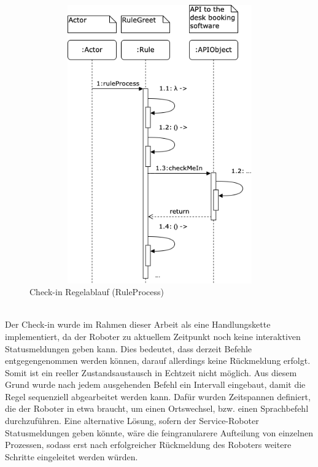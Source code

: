         \begin{figure}[hbt!]
            \centering
            \includegraphics[width=14cm,height=12cm,keepaspectratio]{images/sequence_rule_temi_greet.png}
            \caption{Check-in Regelablauf (RuleProcess)}
            \label{fig:sequenceRuleGreet}
        \end{figure}
        \\
        Der Check-in wurde im Rahmen dieser Arbeit als eine Handlungskette implementiert, da der Roboter zu aktuellem Zeitpunkt noch keine interaktiven Statusmeldungen geben kann. Dies 
        bedeutet, dass derzeit Befehle entgegengenommen werden können, darauf allerdings keine Rückmeldung erfolgt. Somit ist ein reeller Zustandsaustausch in Echtzeit nicht möglich. 
        Aus diesem Grund wurde nach jedem ausgehenden Befehl ein Intervall eingebaut, damit die Regel sequenziell abgearbeitet werden kann. Dafür wurden Zeitspannen definiert, die 
        der Roboter in etwa braucht, um einen Ortswechsel, bzw. einen Sprachbefehl durchzuführen. Eine alternative Lösung, sofern der Service-Roboter Statusmeldungen geben 
        könnte, wäre die feingranularere Aufteilung von einzelnen Prozessen, sodass erst nach erfolgreicher Rückmeldung des Roboters weitere Schritte eingeleitet werden würden.
        \\
        \linebreak
